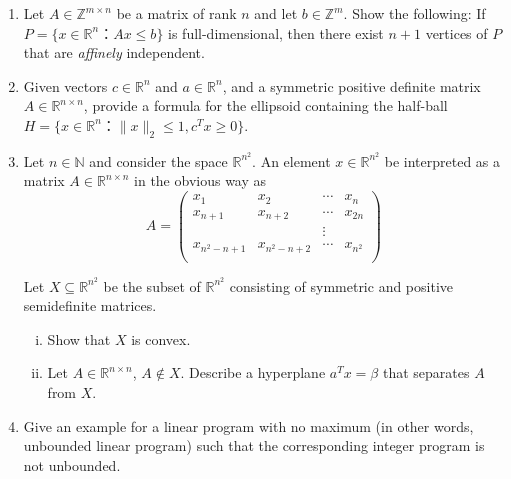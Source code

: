 \documentclass[11pt]{article}
\institute{\'Ecole Polytechnique F\'ed\'erale de Lausanne}
\DeclareMathOperator{\conv}{conv}
\newcommand{\setR}{\mathbb{R}}
\begin{document}
\makeheader

\begin{enumerate}[1)]


    
\item Let $A ∈ ℤ^{m ×n}$ be a matrix of rank $n$ and let $b ∈ ℤ^m$. Show the following: If $P = \{ x ∈ ℝ^n ： Ax ≤ b\}$ is full-dimensional, then there exist $n+1$ vertices of $P$ that are \textit{affinely} independent. 


\item Given vectors $c∈\setR^n$ and $a∈\setR^n$, and a symmetric positive definite matrix $A∈\setR^{n×n}$, provide a formula for the ellipsoid containing the half-ball $H= \{x∈\setR^n ： ∥x∥_2 ≤1, c^Tx≥0\}$.
  
  
\item Let $n ∈ ℕ$ and consider the space $ℝ^{n^2}$. An element $x ∈ℝ^{n^2}$  be interpreted as a matrix $A ∈ ℝ^{n ×n}$  in the obvious way as
  \begin{displaymath}
    A =
    \begin{pmatrix}
      x_1 & x_2 & \cdots & x_n \\
      x_{n+1} & x_{n+2} & \cdots & x_{2n} \\
      & &  \vdots \\
      x_{n^2-n+1} & x_{n^2-n+2} & \cdots &x_{n^2} \\
    \end{pmatrix}
  \end{displaymath}

  Let  $X ⊆ ℝ^{n^2}$ be the subset of $ℝ^{n^2}$ consisting of symmetric and positive semidefinite matrices. 
  \begin{enumerate}[i)]
  \item Show that $X$ is convex.
  \item Let $A ∈ ℝ^{n ×n}$, $A ∉ X$. Describe a hyperplane $a^Tx = β$ that separates $A$ from $X$. 
  \end{enumerate}
  
\item Give an example for a linear program with no maximum (in other
words, unbounded linear program) such that the corresponding integer
program is not unbounded.



\end{enumerate}
\end{document}
